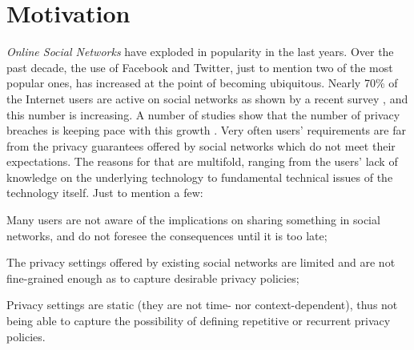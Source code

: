 \vspace{-2mm}
\section{Motivation}
\label{sec:motivation}

{\em Online Social Networks} have exploded in popularity in the last years.
Over the past decade, the use of Facebook and Twitter, just to mention two of the most popular ones, has increased at the point of becoming ubiquitous.
Nearly 70\% of the Internet users are active on social networks as shown by a recent survey \cite{SNSuse}, and this number is increasing.
A number of studies show that the number of privacy breaches is keeping pace with this growth \cite{MJB12spse+,JEM12fpc,YKBA11afps+,MJB11fosn+}.
Very often users' requirements are far from the privacy guarantees offered by social networks  which do not meet their expectations. The reasons for that are multifold, ranging from the users' lack of knowledge on the underlying technology to fundamental technical issues of the technology itself. Just to mention a few:
\begin{inparaenum}[i)]
\item Many users are not aware of the implications on sharing something in social networks, and do not foresee the consequences until it is too late;
\item The privacy settings offered by existing social networks are limited and are not fine-grained enough as to capture desirable privacy policies;
\item Privacy settings are static (they are not time- nor context-dependent), thus not being able to capture the possibility of defining repetitive or recurrent privacy policies.
\end{inparaenum}

